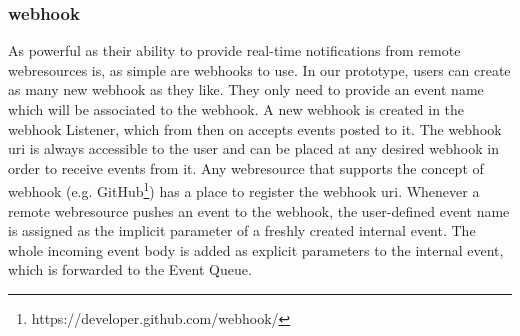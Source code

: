 \subsubsection{\gls{webhook}}
As powerful as their ability to provide real-time notifications from remote \textrm{\glspl{webresource}} is, as simple are \textrm{\glspl{webhook}} to use.
In our prototype, users can create as many new \textrm{\gls{webhook}} as they like.
They only need to provide an event name which will be associated to the \textrm{\gls{webhook}}.
A new \textrm{\gls{webhook}} is created in the \textrm{\gls{webhook} Listener}, which from then on accepts events posted to it.
The \textrm{\gls{webhook} \acrshort{uri}} is always accessible to the user and can be placed at any desired \textrm{\gls{webhook}} in order to receive events from it.
Any \textrm{\gls{webresource}} that supports the concept of \textrm{\gls{webhook}} (e.g. \textrm{GitHub}\footnote{https://developer.github.com/\gls{webhook}/}) has a place to register the \textrm{\gls{webhook}} \textrm{\acrshort{uri}}.
Whenever a remote \textrm{\gls{webresource}} pushes an event to the \textrm{\gls{webhook}}, the user-defined event name is assigned as the implicit parameter of a freshly created internal event.
The whole incoming event body is added as explicit parameters to the internal event, which is forwarded to the \textrm{Event Queue}.



